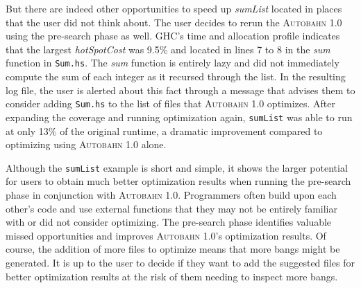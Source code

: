 \documentclass[format=sigplan, review=true]{acmart}
\newcommand{\hotspots}[0]{hot spots}
\newcommand{\hotspotcost}[0]{\textit{hotSpotCost}}
\newcommand{\Ao}[0]{\textsc{Autobahn 1.0}}
\newcommand{\preopt}[0]{pre-search}
\begin{document}
But there are indeed other opportunities to speed up \textit{sumList} located in places that the user did not think about. The user decides to rerun the \Ao{} using the \preopt{} phase as well. GHC's time and allocation profile indicates that the largest \hotspotcost{} was 9.5\% and located in lines 7 to 8 in the \textit{sum} function in \texttt{Sum.hs}. The \textit{sum} function is entirely lazy and did not immediately compute the sum of each integer as it recursed through the list. In the resulting log file, the user is alerted about this fact through a message that advises them to consider adding \texttt{Sum.hs} to the list of files that \Ao{} optimizes. After expanding the coverage and running optimization again, \texttt{sumList} was able to run at only 13\% of the original runtime, a dramatic improvement compared to optimizing using \Ao{} alone.

Although the \texttt{sumList} example is short and simple, it shows the larger potential for users to obtain much better optimization results when running the \preopt{} phase in conjunction with \Ao{}. Programmers often build upon each other's code and use external functions that they may not be entirely familiar with or did not consider optimizing. The \preopt{} phase identifies valuable missed opportunities and improves \Ao{}'s optimization results. Of course, the addition of more files to optimize means that more bangs might be generated. It is up to the user to decide if they want to add the suggested files for better optimization results at the risk of them needing to inspect more bangs.
\newline

\end{document}
